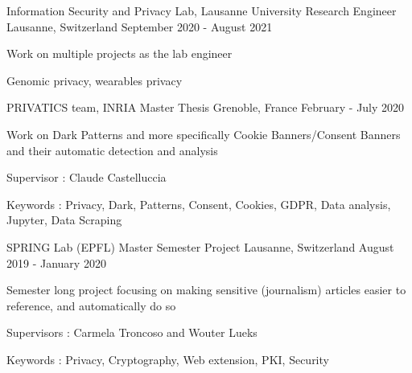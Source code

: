 


\begin{cventries}
	
\cventry
{Information Security and Privacy Lab, Lausanne University} %
{Research Engineer} %
{Lausanne, Switzerland} %
{September 2020 - August 2021} %
{ %
	\begin{cvitems}
		\item {Work on multiple projects as the lab engineer}
		\item {Genomic privacy, wearables privacy}
	\end{cvitems}
}
	
\cventry
{PRIVATICS team, INRIA} %
{Master Thesis} %
{Grenoble, France} %
{February - July 2020} %
{ %
	\begin{cvitems}
		\item {Work on Dark Patterns and more specifically Cookie Banners/Consent Banners and their automatic detection and analysis}
		\item {Supervisor : Claude Castelluccia}
		\item {Keywords : Privacy, Dark, Patterns, Consent, Cookies, GDPR, Data analysis, Jupyter, Data Scraping}
	\end{cvitems}
}

\cventry
{SPRING Lab (EPFL)} %
{Master Semester Project} %
{Lausanne, Switzerland} %
{August 2019 - January 2020} %
{ %
	\begin{cvitems}
		\item {Semester long project focusing on making sensitive (journalism) articles easier to reference, and automatically do so}
		\item {Supervisors : Carmela Troncoso and Wouter Lueks}
		\item {Keywords : Privacy, Cryptography, Web extension, PKI, Security}
	\end{cvitems}
}


\end{cventries}
